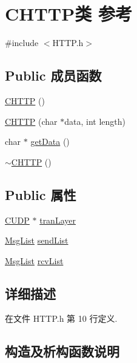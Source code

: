 \hypertarget{class_c_h_t_t_p}{}\section{C\+H\+T\+T\+P类 参考}
\label{class_c_h_t_t_p}


{\ttfamily \#include $<$H\+T\+T\+P.\+h$>$}

\subsection*{Public 成员函数}
\begin{DoxyCompactItemize}
\item 
\hyperlink{class_c_h_t_t_p_a06b2741dd942b78572151f30230457c5}{C\+H\+T\+TP} ()
\item 
\hyperlink{class_c_h_t_t_p_a6c17fb2fe68967e23bd39012b1f70c68}{C\+H\+T\+TP} (char $\ast$data, int length)
\item 
char $\ast$ \hyperlink{class_c_h_t_t_p_a4866e1561e808229ff6244e866356741}{get\+Data} ()
\item 
\hyperlink{class_c_h_t_t_p_a86c6de92efd677b28b3e65aaa8c58427}{$\sim$\+C\+H\+T\+TP} ()
\end{DoxyCompactItemize}
\subsection*{Public 属性}
\begin{DoxyCompactItemize}
\item 
\hyperlink{class_c_u_d_p}{C\+U\+DP} $\ast$ \hyperlink{class_c_h_t_t_p_a0732dddaf54fa24a1554e566fcfa4eef}{tran\+Layer}
\item 
\hyperlink{class_msg_list}{Msg\+List} \hyperlink{class_c_h_t_t_p_a8cf28a01350c98fe3e4cbf4920da25c5}{send\+List}
\item 
\hyperlink{class_msg_list}{Msg\+List} \hyperlink{class_c_h_t_t_p_a86395cb3e64e45d31fda86b8e2ebf9dc}{rcv\+List}
\end{DoxyCompactItemize}


\subsection{详细描述}


在文件 H\+T\+T\+P.\+h 第 10 行定义.



\subsection{构造及析构函数说明}
\mbox{\label{class_c_h_t_t_p_a06b2741dd942b78572151f30230457c5}} 
